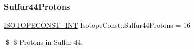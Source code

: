 \subsubsection{\texorpdfstring{Sulfur44\+Protons}{Sulfur44Protons}}
{\footnotesize\ttfamily \mbox{\hyperlink{group___isotope_const-_macros_ga5f18360b3e99483a35c32d789e62621c}{I\+S\+O\+T\+O\+P\+E\+C\+O\+N\+S\+T\+\_\+\+I\+NT}} Isotope\+Const\+::\+Sulfur44\+Protons = 16}

\$ \$ Protons in Sulfur-\/44. 